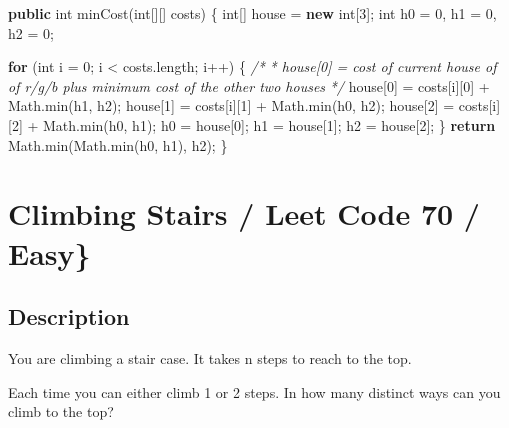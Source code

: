 \documentclass[]{book}
\newenvironment{Shaded}{\begin{snugshade}}{\end{snugshade}}
\newcommand{\BuiltInTok}[1]{#1}
\newcommand{\CommentTok}[1]{\textcolor[rgb]{0.56,0.35,0.01}{\textit{#1}}}
\newcommand{\DataTypeTok}[1]{\textcolor[rgb]{0.13,0.29,0.53}{#1}}
\newcommand{\DecValTok}[1]{\textcolor[rgb]{0.00,0.00,0.81}{#1}}
\newcommand{\FunctionTok}[1]{\textcolor[rgb]{0.00,0.00,0.00}{#1}}
\newcommand{\KeywordTok}[1]{\textcolor[rgb]{0.13,0.29,0.53}{\textbf{#1}}}
\newcommand{\NormalTok}[1]{#1}
\begin{document}
\begin{Shaded}
\begin{Highlighting}[]
\KeywordTok{public} \DataTypeTok{int} \FunctionTok{minCost}\NormalTok{(}\DataTypeTok{int}\NormalTok{[][] costs) \{}
    \DataTypeTok{int}\NormalTok{[] house = }\KeywordTok{new} \DataTypeTok{int}\NormalTok{[}\DecValTok{3}\NormalTok{];}
    \DataTypeTok{int}\NormalTok{ h0 = }\DecValTok{0}\NormalTok{, h1 = }\DecValTok{0}\NormalTok{, h2 = }\DecValTok{0}\NormalTok{;}

    \KeywordTok{for}\NormalTok{ (}\DataTypeTok{int}\NormalTok{ i = }\DecValTok{0}\NormalTok{; i < costs.}\FunctionTok{length}\NormalTok{; i++) \{}
        \CommentTok{/*}
\CommentTok{        * house[0] = cost of current house of of r/g/b plus minimum cost of the other two houses}
\CommentTok{        */}
\NormalTok{        house[}\DecValTok{0}\NormalTok{] = costs[i][}\DecValTok{0}\NormalTok{] + }\BuiltInTok{Math}\NormalTok{.}\FunctionTok{min}\NormalTok{(h1, h2);}
\NormalTok{        house[}\DecValTok{1}\NormalTok{] = costs[i][}\DecValTok{1}\NormalTok{] + }\BuiltInTok{Math}\NormalTok{.}\FunctionTok{min}\NormalTok{(h0, h2);}
\NormalTok{        house[}\DecValTok{2}\NormalTok{] = costs[i][}\DecValTok{2}\NormalTok{] + }\BuiltInTok{Math}\NormalTok{.}\FunctionTok{min}\NormalTok{(h0, h1);}
\NormalTok{        h0 = house[}\DecValTok{0}\NormalTok{];}
\NormalTok{        h1 = house[}\DecValTok{1}\NormalTok{];}
\NormalTok{        h2 = house[}\DecValTok{2}\NormalTok{];}
\NormalTok{    \}}
    \KeywordTok{return} \BuiltInTok{Math}\NormalTok{.}\FunctionTok{min}\NormalTok{(}\BuiltInTok{Math}\NormalTok{.}\FunctionTok{min}\NormalTok{(h0, h1), h2);}
\NormalTok{\}}
\end{Highlighting}
\end{Shaded}

\hypertarget{climbing-stairs-leet-code-70-easy}{%
\section{Climbing Stairs / Leet Code 70 / Easy\}}\label{climbing-stairs-leet-code-70-easy}}

\hypertarget{description-30}{%
\subsection{Description}\label{description-30}}

You are climbing a stair case. It takes n steps to reach to the top.

Each time you can either climb 1 or 2 steps. In how many distinct ways can you climb to the top?
\end{document}
